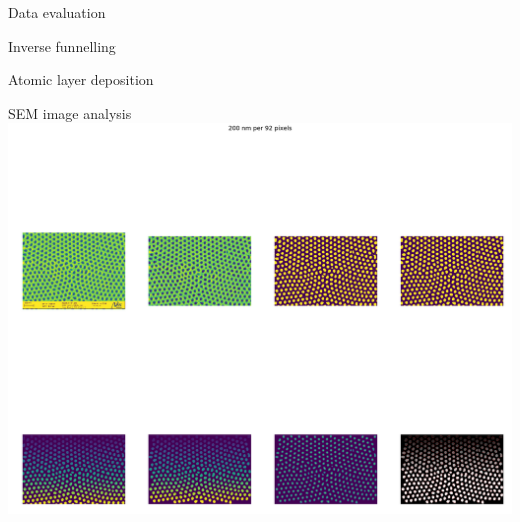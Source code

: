 \documentclass{beamer}
\begin{document}
  \begin{frame}{Data evaluation}

  \end{frame}



  \begin{frame}{Inverse funnelling}

  \end{frame}



  \begin{frame}{Atomic layer deposition}

  \end{frame}



  \begin{frame}{SEM image analysis}
    \includegraphics[width=\linewidth]{images/AAM_295_PO_30 um_Al_26.tif.png}
  \end{frame}
\end{document}
